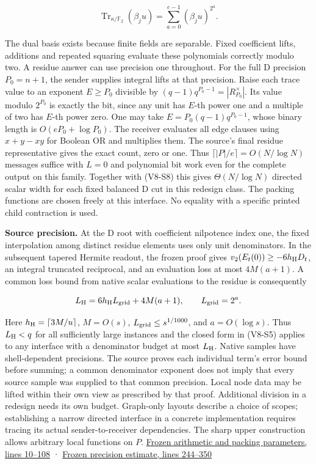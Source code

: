 \documentclass[
  11pt,
]{article}
\begin{document}
\[
       \operatorname{Tr}_{\kappa/\mathbb F_2}(\beta_j u)
             =\sum_{a=0}^{e-1}(\beta_j u)^{2^a}.
\]

The dual basis exists because finite fields are separable. Fixed
coefficient lifts, additions and repeated squaring evaluate these
polynomials correctly modulo two. A residue answer can use precision one
throughout. For the full D precision \(P_0=n+1\), the sender supplies
integral lifts at that precision. Raise each trace value to an exponent
\(E\ge P_0\) divisible by \((q-1)q^{P_0-1}=|R_{P_0}^{\times}|\). Its
value modulo \(2^{P_0}\) is exactly the bit, since any unit has \(E\)-th
power one and a multiple of two has \(E\)-th power zero. One may take
\(E=P_0(q-1)q^{P_0-1}\), whose binary length is \(O(eP_0+\log P_0)\).
The receiver evaluates all edge clauses using \(x+y-xy\) for Boolean OR
and multiplies them. The source's final residue representative gives the
exact count, zero or one. Thus \(\lceil |P|/e\rceil=O(N/\log N)\)
messages suffice with \(L=0\) and polynomial bit work even for the
complete output on this family. Together with (V8-S8) this gives
\(\Theta(N/\log N)\) directed scalar width for each fixed balanced D cut
in this redesign class. The packing functions are chosen freely at this
interface. No equality with a specific printed child contraction is
used.

\textbf{Source precision.} At the D root with coefficient nilpotence
index one, the fixed interpolation among distinct residue elements uses
only unit denominators. In the subsequent tapered Hermite readout, the
frozen proof gives \(v_2(E_t(0))\ge-6h_{\rm H}D_t\), an integral
truncated reciprocal, and an evaluation loss at most \(4M(a+1)\). A
common loss bound from native scalar evaluations to the residue is
consequently

\[
       L_{\rm H}=6h_{\rm H}L_{\rm grid}+4M(a+1),\qquad L_{\rm grid}=2^a .
\]

Here \(h_{\rm H}=\lceil3M/u\rceil\), \(M=O(s)\),
\(L_{\rm grid}\le s^{1/1000}\), and \(a=O(\log s)\). Thus
\(L_{\rm H}<q\) for all sufficiently large instances and the closed form
in (V8-S5) applies to any interface with a denominator budget at most
\(L_{\rm H}\). Native samples have shell-dependent precisions. The
source proves each individual term's error bound before summing; a
common denominator exponent does not imply that every source sample was
supplied to that common precision. Local node data may be lifted within
their own view as prescribed by that proof. Additional division in a
redesign needs its own budget. Graph-only layouts describe a choice of
scopes; establishing a narrow directed interface in a concrete
implementation requires tracing its actual sender-to-receiver
dependencies. The sharp upper construction allows arbitrary local
functions on \(P\).
\href{https://github.com/openai/math/blob/main/preprints/The-Exponential-Time-Hypothesis-is-False-October-25-2026/build/quantitative-contraction.tex\#L10-L108}{Frozen
arithmetic and packing parameters, lines 10--108} ·
\href{https://github.com/openai/math/blob/main/preprints/The-Exponential-Time-Hypothesis-is-False-October-25-2026/build/quantitative-contraction.tex\#L244-L350}{Frozen
precision estimate, lines 244--350}
\end{document}

